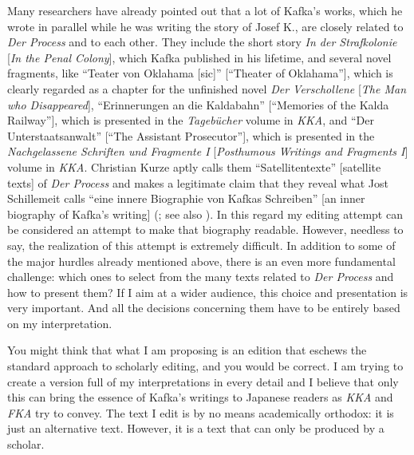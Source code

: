 \begin{paper}
Many researchers have already pointed out that a lot of Kafka's works,
which he wrote in parallel while he was writing the story of Josef K.,
are closely related to \emph{Der Process} and to each other. They
include the short story \emph{In der Strafkolonie} {[}\emph{In the Penal
Colony}{]}, which Kafka published in his lifetime, and several novel
fragments, like ``Teater von Oklahama [sic]'' {[}``Theater of
Oklahama''{]}, which is clearly regarded as a chapter for the unfinished novel
\emph{Der Verschollene} {[}\emph{The Man who Disappeared}{]},
``Erinnerungen an die Kaldabahn'' {[}``Memories of the Kalda
Railway''{]}, which is presented in the \emph{Tagebücher} volume in
\emph{KKA}, and ``Der Unterstaatsanwalt'' {[}``The Assistant
Prosecutor''{]}, which is presented in the \emph{Nachgelassene
Schriften und Fragmente I} {[}\emph{Posthumous Writings and Fragments
I}{]} volume in \emph{KKA}. Christian Kurze aptly calls them
``Satellitentexte'' {[}satellite texts{]} of \emph{Der Process} and
makes a legitimate claim that they reveal what Jost Schillemeit calls
``eine innere Biographie von Kafkas Schreiben'' {[}an inner biography
of Kafka's writing{]} (\cite{kurze_kafkas_2016}; see also \cite[224]{schillemeit_unterbrochene_2004}). In
this regard my editing attempt can be considered an attempt to make that
biography readable. However, needless to say, the realization of this
attempt is extremely difficult. In addition to some of the major hurdles
already mentioned above, there is an even more fundamental challenge:
which ones to select from the many texts related to \emph{Der Process}
and how to present them? If I aim at a wider audience, this
choice and presentation is very important. And all the decisions
concerning them have to be entirely based on my interpretation.

You might think that what I am proposing is an edition that eschews the
standard approach to scholarly editing, and you would be correct. I am
trying to create a version full of my interpretations in every detail and I believe that only this can bring the essence of Kafka's
writings to Japanese readers as \emph{KKA} and \emph{FKA} try to convey.
The text I edit is by no means academically orthodox: it is just an
alternative text. However, it is a text that can only be produced by a
scholar.


\end{paper}
